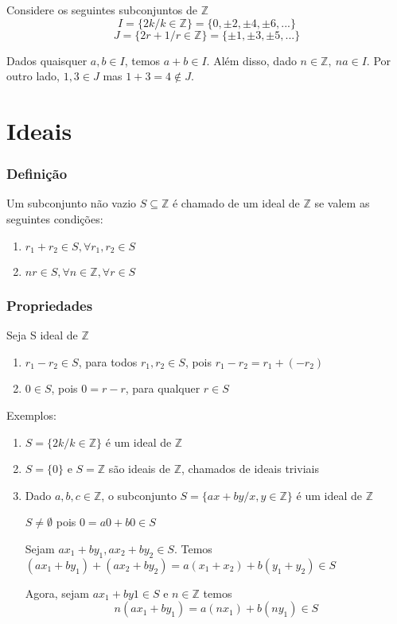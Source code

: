 Considere os seguintes subconjuntos de $\mathbb{Z}$\\
\[I=\{2k/k\in\mathbb{Z}\}=\{0,\pm 2,\pm 4,\pm 6,...\}\]\[J=\{2r+1/r\in\mathbb{Z}\}=\{\pm 1,\pm 3,\pm 5,...\}\]

Dados quaisquer $a,b\in I$, temos $a+b\in I$. Al{\'e}m disso, dado $n\in\mathbb{Z},\ na\in I$. Por outro lado, $1,3\in J$ mas $1+3=4\notin J$.

\section{Ideais}

\subsubsection{Defini{\c c}{\~a}o}
\begin{definicao}[Ideal] Um subconjunto n{\~a}o vazio $S\subseteq\mathbb{Z}$ {\'e} chamado de um ideal de $\mathbb{Z}$ se valem as seguintes condi{\c c}{\~o}es:
\begin{enumerate}
\item $r_{1}+r_{2}\in S,\forall r_{1},r_{2}\in S$
\item $nr\in S,\forall n\in\mathbb{Z},\forall r\in S$
\end{enumerate}
\end{definicao}

\subsubsection{Propriedades}
Seja S ideal de $\mathbb{Z}$
\begin{enumerate}
\item $r_{1}-r_{2}\in S$, para todos $r_{1}, r_{2}\in S$, pois $r_{1}-r_{2}=r_{1}+(-r_{2})$
\item $0\in S$, pois $0=r-r$, para qualquer $r\in S$
\end{enumerate}

Exemplos:
\begin{enumerate}
\item $S=\{2k/k\in\mathbb{Z}\}$ {\'e} um ideal de $\mathbb{Z}$
\item $S=\{0\}$ e $S=\mathbb{Z}$ s{\~a}o ideais de $\mathbb{Z}$, chamados de ideais triviais
\item Dado $a,b,c\in\mathbb{Z}$, o subconjunto $S=\{ax+by/x,y\in\mathbb{Z}\}$ {\'e} um ideal de $\mathbb{Z}$

$S\neq\emptyset$ pois $0=a0+b0\in S$

Sejam $ax_{1}+by_{1},ax_{2}+by_{2}\in S$. Temos $(ax_{1}+by_{1})+(ax_{2}+by_{2})=a(x_{1}+x_{2})+b(y_{1}+y_{2})\in S$

Agora, sejam $ax_{1}+by{1}\in S$ e $n\in\mathbb{Z}$ temos \[n(ax_{1}+by_{1})=a(nx_{1})+b(ny_{1})\in S\]
\end{enumerate}


